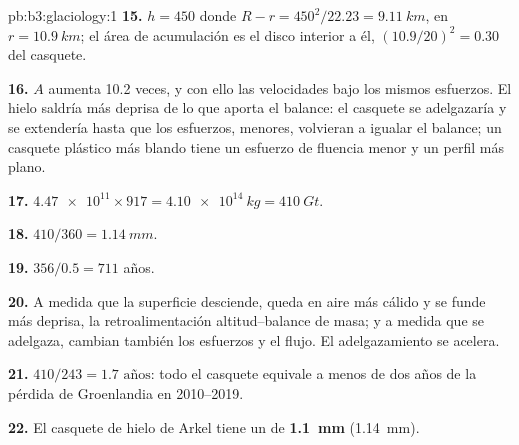 \begin{solution}{pb:b3:glaciology:1}
\textbf{15.} $h = 450$ donde $R - r = 450^2/22.23 = \qty{9.11}{km}$, en
$r = \qty{10.9}{km}$; el área de acumulación es el disco interior a él, $(10.9/
20)^2 = 0.30$ del casquete.

\textbf{16.} $A$ aumenta \num{10.2} veces, y con ello las velocidades bajo los mismos
esfuerzos. El hielo saldría más deprisa de lo que aporta el balance: el
casquete se adelgazaría y se extendería hasta que los esfuerzos, menores, volvieran a igualar el
balance; un casquete plástico más blando tiene un esfuerzo de fluencia menor y un
perfil más plano.

\textbf{17.} $\num{4.47e11}\times917 = \qty{4.10e14}{kg} = \qty{410}{Gt}$.

\textbf{18.} $410/360 = \qty{1.14}{mm}$.

\textbf{19.} $356/0.5 = 711$ años.

\textbf{20.} A medida que la superficie desciende, queda en aire más cálido y se funde más deprisa,
la retroalimentación altitud--balance de masa; y a medida que se adelgaza, cambian también los esfuerzos y el
flujo. El adelgazamiento se acelera.

\textbf{21.} $410/243 = \num{1.7}\text{ años}$: todo el casquete equivale a menos de dos
años de la pérdida de Groenlandia en 2010--2019.

\textbf{22.} El casquete de hielo de Arkel tiene un  de
\textbf{\qty[text-series-to-math=true]{1.1}{mm}} (\qty{1.14}{mm}).
\end{solution}
